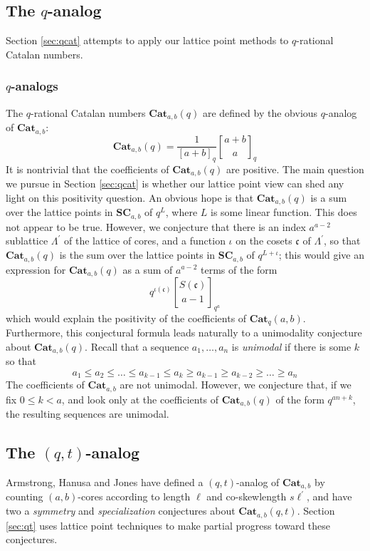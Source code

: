 \documentclass{amsart}[12pt]
\theoremstyle{definition}
\newcommand{\SC}{\mathbf{SC}}
\newcommand{\Cat}{\mathbf{Cat}}
\newcommand{\sk}{s\ell}
\begin{document}
\subsection{The \texorpdfstring{$q$}{q}-analog}
Section \ref{sec:qcat} attempts to apply our lattice point methods to $q$-rational Catalan numbers.
\subsubsection{$q$-analogs}
The $q$-rational Catalan numbers $\Cat_{a,b}(q)$ are defined by the obvious $q$-analog of $\Cat_{a,b}$:
$$\Cat_{a,b}(q)=\frac{1}{[a+b]_q}{a+b \brack a}_q$$
It is nontrivial that the coefficients of $\Cat_{a,b}(q)$ are positive. The main question we pursue in Section \ref{sec:qcat} is whether our lattice point view can shed any light on this positivity question.
An obvious hope is that $\Cat_{a,b}(q)$ is a sum over the lattice points in $\SC_{a,b}$ of $q^L$, where $L$ is some linear function. This does not appear to be true. However, we conjecture that there is an index $a^{a-2}$ sublattice $\Lambda^\prime$ of the lattice of cores, and a function $\iota$ on the cosets $\mathfrak{c}$ of $\Lambda^\prime$, so that $\Cat_{a,b}(q)$ is the sum over the lattice points in $\SC_{a,b}$ of $q^{L+\iota}$; this would give an expression for $\Cat_{a,b}(q)$ as a sum of $a^{a-2}$ terms of the form
$$q^{\iota(\mathfrak{c})}{S(\mathfrak{c}) \brack a-1}_{q^a}$$
which would explain the positivity of the coefficients of $\Cat_q(a,b)$.
Furthermore, this conjectural formula leads naturally to a unimodality conjecture about $\Cat_{a,b}(q)$. Recall that a sequence $a_1,\dots, a_n$ is \emph{unimodal} if there is some $k$ so that $$a_1\leq a_2\leq \dots \leq a_{k-1}\leq a_k \geq a_{k-1} \geq a_{k-2}\geq\dots\geq a_n$$
The coefficients of $\Cat_{a,b}$ are not unimodal. However, we conjecture that, if we fix $0
\leq k <a$, and look only at the coefficients of $\Cat_{a,b}(q)$ of the form $q^{an+k}$, the resulting sequences are unimodal.
\subsection{The \texorpdfstring{$(q,t)$}{(q,t)}-analog}
Armstrong, Hanusa and Jones \cite{AHJ} have defined a $(q,t)$-analog of $\Cat_{a,b}$ by counting $(a,b)$-cores according to length $\ell$ and co-skewlength $\sk^\prime$, and have two a \emph{symmetry} and \emph{specialization} conjectures about $\Cat_{a,b}(q,t)$. Section \ref{sec:qt} uses lattice point techniques to make partial progress toward these conjectures.
\end{document}
